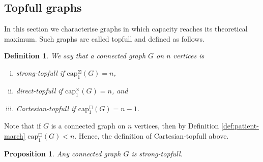 \documentclass{article}
\newtheorem{definition}[theorem]{Definition}
\newtheorem{proposition}[theorem]{Proposition}
\newcommand{\dcap}[2]{\mathrm{cap}^{\times}_{#1}(#2)}
\newcommand{\scap}[2]{\mathrm{cap}^{\boxtimes}_{#1}(#2)}
\newcommand{\ccap}[2]{\mathrm{cap}^{\mathbin{\Box}}_{#1}(#2)}
\begin{document}
\subsection{Topfull graphs}\label{sec:topfull}

In this section we characterise graphs in which capacity reaches its theoretical maximum. Such graphs are called topfull and defined as follows.

\begin{definition}
We say that a connected graph $G$ on $n$ vertices is 
\begin{enumerate}[(i)]
    \item \emph{strong-topfull} if $\scap{1}{G}=n$, 
    \item \emph{direct-topfull} if $\dcap{1}{G}=n$, and
    \item \emph{Cartesian-topfull} if $\ccap{1}{G}=n-1$.
\end{enumerate}
\end{definition}

Note that if $G$ is a connected graph on $n$ vertices, then by Definition \ref{def:patient-march} $\ccap{1}{G}<n$. Hence, the definition of Cartesian-topfull above.

\begin{proposition}\label{prop:strong-1}
    Any connected graph $G$ is strong-topfull.
\end{proposition}
\end{document}
